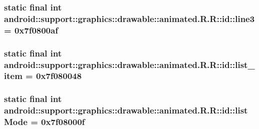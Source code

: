 \hypertarget{classandroid_1_1support_1_1graphics_1_1drawable_1_1animated_1_1_r_1_1id_a30b61475ac8aa162c68152f8814f9f1}{
\subsubsection[{line3}]{\setlength{\rightskip}{0pt plus 5cm}static final int android::support::graphics::drawable::animated.R.R::id::line3 = 0x7f0800af}}
\label{classandroid_1_1support_1_1graphics_1_1drawable_1_1animated_1_1_r_1_1id_a30b61475ac8aa162c68152f8814f9f1}


\hypertarget{classandroid_1_1support_1_1graphics_1_1drawable_1_1animated_1_1_r_1_1id_68e4b72df2a873a475c2198587325da4}{
\subsubsection[{list\_\-item}]{\setlength{\rightskip}{0pt plus 5cm}static final int android::support::graphics::drawable::animated.R.R::id::list\_\-item = 0x7f080048}}
\label{classandroid_1_1support_1_1graphics_1_1drawable_1_1animated_1_1_r_1_1id_68e4b72df2a873a475c2198587325da4}


\hypertarget{classandroid_1_1support_1_1graphics_1_1drawable_1_1animated_1_1_r_1_1id_5005d7c9dc4323dba528897150df4290}{
\subsubsection[{listMode}]{\setlength{\rightskip}{0pt plus 5cm}static final int android::support::graphics::drawable::animated.R.R::id::listMode = 0x7f08000f}}
\label{classandroid_1_1support_1_1graphics_1_1drawable_1_1animated_1_1_r_1_1id_5005d7c9dc4323dba528897150df4290}


